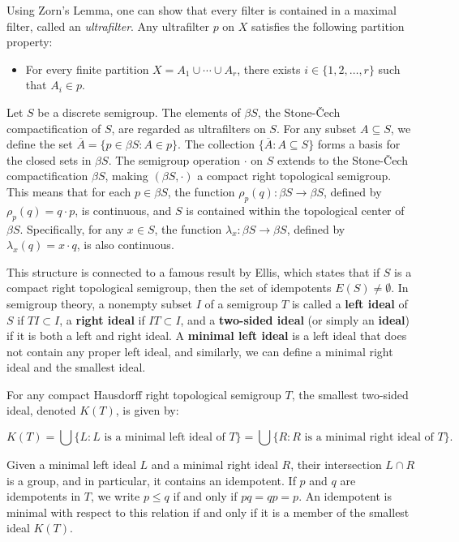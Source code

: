 \documentclass{article}
\theoremstyle{Theorem}
\theoremstyle{definition}
\begin{document}
Using Zorn's Lemma, one can show that every filter is contained in a maximal filter, called an \emph{ultrafilter}. Any ultrafilter \( p \) on \( X \) satisfies the following partition property:
\begin{itemize}
    \item For every finite partition \( X = A_1 \cup \cdots \cup A_r \), there exists \( i \in \{1, 2, \ldots, r\} \) such that \( A_i \in p \).
\end{itemize}


Let \( S \) be a discrete semigroup. The elements of \( \beta S \), the Stone-\v{C}ech compactification of \( S \), are regarded as ultrafilters on \( S \). For any subset \( A \subseteq S \), we define the set \( \overline{A} = \{ p \in \beta S : A \in p \} \). The collection \( \{\overline{A} : A \subseteq S \} \) forms a basis for the closed sets in \( \beta S \). The semigroup operation \( \cdot \) on \( S \) extends to the Stone-\v{C}ech compactification \( \beta S \), making \( (\beta S, \cdot) \) a compact right topological semigroup. This means that for each \( p \in \beta S \), the function \( \rho_p(q) : \beta S \to \beta S \), defined by \( \rho_p(q) = q \cdot p \), is continuous, and \( S \) is contained within the topological center of \( \beta S \). Specifically, for any \( x \in S \), the function \( \lambda_x : \beta S \to \beta S \), defined by \( \lambda_x(q) = x \cdot q \), is also continuous.

This structure is connected to a famous result by Ellis, which states that if \( S \) is a compact right topological semigroup, then the set of idempotents \( E(S) \neq \emptyset \). In semigroup theory, a nonempty subset \( I \) of a semigroup \( T \) is called a \textbf{left ideal} of \( S \) if \( T I \subset I \), a \textbf{right ideal} if \( I T \subset I \), and a \textbf{two-sided ideal} (or simply an \textbf{ideal}) if it is both a left and right ideal. A \textbf{minimal left ideal} is a left ideal that does not contain any proper left ideal, and similarly, we can define a minimal right ideal and the smallest ideal.

For any compact Hausdorff right topological semigroup \( T \), the smallest two-sided ideal, denoted \( K(T) \), is given by:


\[
K(T) = \bigcup \{ L : L \text{ is a minimal left ideal of } T \} = \bigcup \{ R : R \text{ is a minimal right ideal of } T \}.
\]


Given a minimal left ideal \( L \) and a minimal right ideal \( R \), their intersection \( L \cap R \) is a group, and in particular, it contains an idempotent. If \( p \) and \( q \) are idempotents in \( T \), we write \( p \leq q \) if and only if \( pq = qp = p \). An idempotent is minimal with respect to this relation if and only if it is a member of the smallest ideal \( K(T) \).
\end{document}
